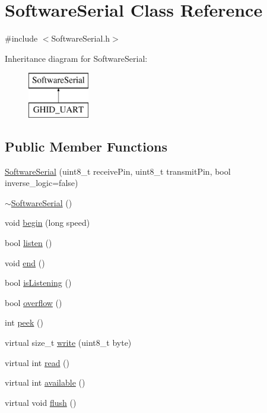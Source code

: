 \hypertarget{class_software_serial}{\section{\-Software\-Serial \-Class \-Reference}
\label{class_software_serial}
}


{\ttfamily \#include $<$\-Software\-Serial.\-h$>$}

\-Inheritance diagram for \-Software\-Serial\-:\begin{figure}[H]
\begin{center}
\leavevmode
\includegraphics[height=2.000000cm]{class_software_serial}
\end{center}
\end{figure}
\subsection*{\-Public \-Member \-Functions}
\begin{DoxyCompactItemize}
\item 
\hyperlink{class_software_serial_aab36336db4a1ca5073071c07d910cb87}{\-Software\-Serial} (uint8\-\_\-t receive\-Pin, uint8\-\_\-t transmit\-Pin, bool inverse\-\_\-logic=false)
\item 
\hyperlink{class_software_serial_af6b8fff282e09a6cecc5df669ae71ee7}{$\sim$\-Software\-Serial} ()
\item 
void \hyperlink{class_software_serial_af1b194359d70894b3a2f38236a68480e}{begin} (long speed)
\item 
bool \hyperlink{class_software_serial_ad235539ef28939836bd0bde9387eb8fc}{listen} ()
\item 
void \hyperlink{class_software_serial_a9034270f7de617b3cc7d3f38f3a8e0df}{end} ()
\item 
bool \hyperlink{class_software_serial_a7b3fb4a8f57d2b5f2233f841d71ef80f}{is\-Listening} ()
\item 
bool \hyperlink{class_software_serial_ac6d4d5dfbe05515bf23766e2c8abfd46}{overflow} ()
\item 
int \hyperlink{class_software_serial_a51c2d2e79f0d982b1ef9cc9ac4453648}{peek} ()
\item 
virtual size\-\_\-t \hyperlink{class_software_serial_ac24e5c6af203ec636c0a200b0cb3caf0}{write} (uint8\-\_\-t byte)
\item 
virtual int \hyperlink{class_software_serial_a2d0b2f2868d519c716114777f482705b}{read} ()
\item 
virtual int \hyperlink{class_software_serial_a4cbf77a4e90e15ca576972d7952659c5}{available} ()
\item 
virtual void \hyperlink{class_software_serial_a9a46db376a19fc958e011e38799b902c}{flush} ()
\end{DoxyCompactItemize}
